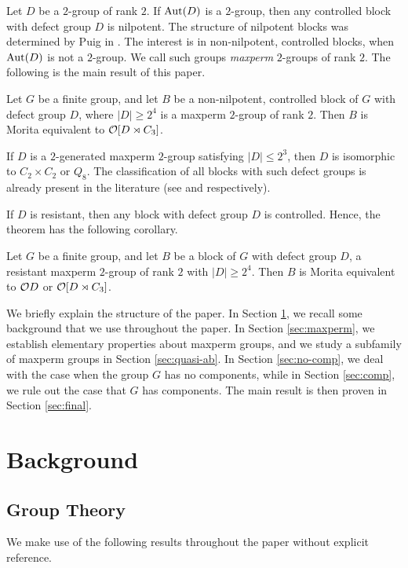 \documentclass[bysection, amsart]{standard}
\begin{document}
Let $D$ be a $2$-group of rank $2$. If $\operatorname{Aut}(D)$ is a $2$-group, then any controlled block with defect group $D$ is nilpotent. The structure of nilpotent blocks was determined by Puig in \cite{paper:nilpotent}. The interest is in non-nilpotent, controlled blocks, when $\operatorname{Aut}(D)$ is not a $2$-group. We call such groups \emph{maxperm} $2$-groups of rank $2$. The following is the main result of this paper.
\begin{theorem}
    Let $G$ be a finite group, and let $B$ be a non-nilpotent, controlled block of $G$ with defect group $D$, where $|D| \geq 2^4$ is a maxperm $2$-group of rank $2$. Then $B$ is Morita equivalent to $\mathcal{O} [D \rtimes C_3]$.
\end{theorem}
\noindent If $D$ is a $2$-generated maxperm $2$-group satisfying $|D| \leq 2^3$, then $D$ is isomorphic to $C_2 \times C_2$ or $Q_8$. The classification of all blocks with such defect groups is already present in the literature (see \cite{paper:li-c2c2} and \cite{paper:ei-q8} respectively).

If $D$ is resistant, then any block with defect group $D$ is controlled. Hence, the theorem has the following corollary.
\begin{corollary}
    Let $G$ be a finite group, and let $B$ be a block of $G$ with defect group $D$, a resistant maxperm $2$-group of rank $2$ with $|D| \geq 2^4$. Then $B$ is Morita equivalent to $\mathcal{O} D$ or $\mathcal{O}[D \rtimes C_3]$.
\end{corollary}


We briefly explain the structure of the paper. In Section \ref{sec:background}, we recall some background that we use throughout the paper. In Section \ref{sec:maxperm}, we establish elementary properties about maxperm groups, and we study a subfamily of maxperm groups in Section \ref{sec:quasi-ab}. In Section \ref{sec:no-comp}, we deal with the case when the group $G$ has no components, while in Section \ref{sec:comp}, we rule out the case that $G$ has components. The main result is then proven in Section \ref{sec:final}.

\section{Background} \label{sec:background}
\subsection{Group Theory} We make use of the following results throughout the paper without explicit reference.
\end{document}
